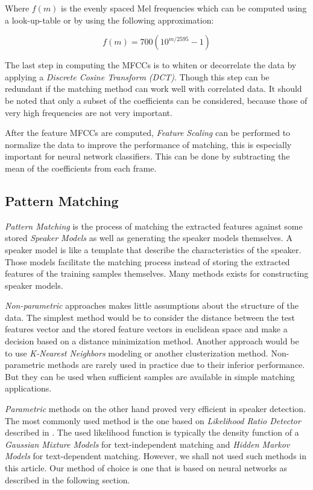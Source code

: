 \documentclass[twocolumn]{article}
\begin{document}
Where $f(m)$ is the evenly spaced Mel frequencies which can be computed using a
look-up-table or by using the following approximation:

\begin{equation}
f(m) = 700(10^{m / 2595} - 1)
\end{equation}

The last step in computing the MFCCs is to whiten or decorrelate the data by
applying a \emph{Discrete Cosine Transform (DCT)}. Though this step can be
redundant if the matching method can work well with correlated data. It should
be noted that only a subset of the coefficients can be considered, because
those of very high frequencies are not very important.

After the feature MFCCs are computed, \emph{Feature Scaling} can be performed
to normalize the data to improve the performance of matching, this is
especially important for neural network classifiers. This can be done by
subtracting the mean of the coefficients from each frame.

\subsection{Pattern Matching}

\emph{Pattern Matching} is the process of matching the extracted features
against some stored \emph{Speaker Models} as well as generating the speaker
models themselves. A speaker model is like a template that describe the
characteristics of the speaker. Those models facilitate the matching process
instead of storing the extracted features of the training samples themselves.
Many methods exists for constructing speaker models.

\emph{Non-parametric} approaches makes little assumptions about the structure
of the data. The simplest method would be to consider the distance between the
test features vector and the stored feature vectors in euclidean space and make
a decision based on a distance minimization method. Another approach would be
to use \emph{K-Nearest Neighbors} modeling or another clusterization method.
Non-parametric methods are rarely used in practice due to their inferior
performance. But they can be used when sufficient samples are available in
simple matching applications.

\emph{Parametric} methods on the other hand proved very efficient in speaker
detection. The most commonly used method is the one based on \emph{Likelihood
Ratio Detector} described in \autocite{Dunn2000}. The used likelihood function
is typically the density function of a \emph{Gaussian Mixture Models} for
text-independent matching and \emph{Hidden Markov Models} for text-dependent
matching. However, we shall not used such methods in this article. Our method
of choice is one that is based on neural networks as described in the following
section.
\end{document}
